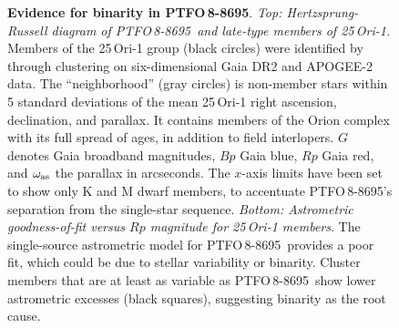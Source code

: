 \documentclass[12pt,twocolumn,tighten]{aastex62}
\newcommand{\ptfo}{PTFO$\,$8-8695}
\begin{document}
\begin{figure}[t]
	\begin{center}
		\leavevmode
		
		\vspace{-0.7cm}
	\end{center}
	\vspace{-0.7cm}
	\caption{ {\bf Evidence for binarity in \ptfo}.
    {\it Top: Hertzsprung-Russell diagram of \ptfo\ and late-type
    members of 25$\,$Ori-1.} Members of the 25$\,$Ori-1 group (black
    circles) were identified by \citet{kounkel_apogee2_2018} through
    clustering on six-dimensional Gaia DR2 and APOGEE-2 data.  The
    ``neighborhood'' (gray circles) is non-member stars within 5
    standard deviations of the mean 25$\,$Ori-1 right ascension,
    declination, and parallax.  It contains members of the Orion
    complex with its full spread of ages, in addition to field
    interlopers.  $G$ denotes Gaia broadband magnitudes, $Bp$ Gaia
    blue, $Rp$ Gaia red, and $\omega_{\rm as}$ the parallax in
    arcseconds.  The $x$-axis limits have been set to show only K and
    M dwarf members, to accentuate \ptfo's separation from the
    single-star sequence.  {\it Bottom: Astrometric goodness-of-fit
    versus $Rp$ magnitude for 25$\,$Ori-1 members}.  The single-source
    astrometric model for \ptfo\ provides a poor fit, which could be due to
    stellar variability or binarity.  Cluster members that
    are at least as variable as \ptfo\ show lower astrometric excesses
    (black squares), suggesting binarity as the root cause.
		\label{fig:gaia}
	}
\end{figure}
\end{document}
